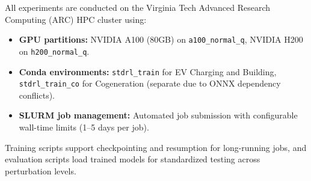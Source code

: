 All experiments are conducted on the Virginia Tech Advanced Research Computing (ARC) HPC cluster using:
\begin{itemize}
    \item \textbf{GPU partitions:} NVIDIA A100 (80GB) on \texttt{a100\_normal\_q}, NVIDIA H200 on \texttt{h200\_normal\_q}.
    \item \textbf{Conda environments:} \texttt{stdrl\_train} for EV Charging and Building, \texttt{stdrl\_train\_co} for Cogeneration (separate due to ONNX dependency conflicts).
    \item \textbf{SLURM job management:} Automated job submission with configurable wall-time limits (1--5 days per job).
\end{itemize}

Training scripts support checkpointing and resumption for long-running jobs, and evaluation scripts load trained models for standardized testing across perturbation levels.


